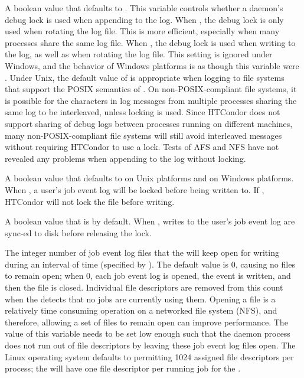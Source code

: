 \begin{description}
\label{param:LockDebugLogToAppend}
\item[\Macro{LOCK\_DEBUG\_LOG\_TO\_APPEND}]
  A boolean value that defaults to .
  This variable controls whether a daemon's debug lock is used when
  appending to the log.  
  When , the debug lock is only used when rotating the log file.
  This is more efficient, 
  especially when many processes share the same log file.
  When , the debug lock is used when writing to the log,
  as well as when rotating the log file.  
  This setting is ignored under Windows,
  and the behavior of Windows platforms is as though 
  this variable were .
  Under Unix, the default value of  is appropriate when
  logging to file systems that support the POSIX semantics of .
  On non-POSIX-compliant file systems, 
  it is possible for the characters in log messages from multiple processes
  sharing the same log to be interleaved, unless locking is used.
  Since HTCondor does not support sharing of debug logs between
  processes running on different machines, many non-POSIX-compliant
  file systems will still avoid interleaved messages without requiring
  HTCondor to use a lock.  Tests of AFS and NFS have
  not revealed any problems when appending to the log without locking.

\label{param:EnableUserlogLocking}
\item[\Macro{ENABLE\_USERLOG\_LOCKING}]
  A boolean value that defaults to  on Unix platforms and
   on Windows platforms.
  When , a user's job event log
  will be locked before being written to.
  If , HTCondor will not lock the file before writing.

\label{param:EnableUserlogFsync}
\item[\Macro{ENABLE\_USERLOG\_FSYNC}]
  A boolean value that is  by default.
  When , writes to the user's job event log are sync-ed to
  disk before releasing the lock.

\label{param:UserlogFileCacheMax}
\item[\Macro{USERLOG\_FILE\_CACHE\_MAX}]
  The integer number of job event log files that the 
  will keep open for writing during an interval of time
  (specified by ).
  The default value is 0, causing no files to remain open;
  when 0, each job event log is opened, the event is written, and then the
  file is closed.
  Individual file descriptors are removed from this count 
  when the  detects that no jobs are currently using them.
  Opening a file is a relatively time consuming operation on a
  networked file system (NFS),
  and therefore, 
  allowing a set of files to remain open can improve performance.
  The value of this variable needs to be set low enough such that the
   daemon process does not run out of file descriptors by
  leaving these job event log files open.
  The Linux operating system defaults to permitting 1024 assigned
  file descriptors per process; the  will have one
  file descriptor per running job for the . 


\end{description}
